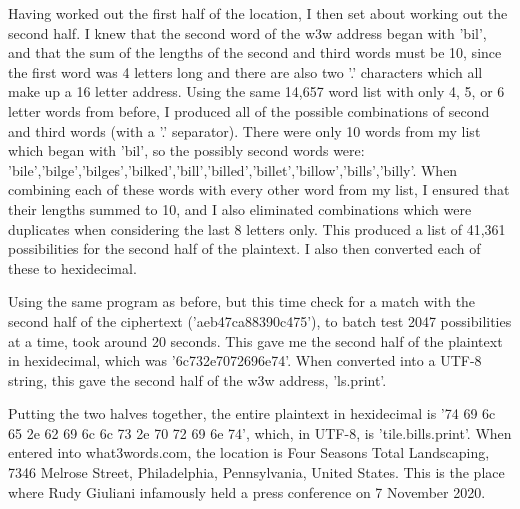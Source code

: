 \documentclass[a4paper, 11pt]{article}
\begin{document}
Having worked out the first half of the location, I then set about working out the second half. 
I knew that the second word of the w3w address began with 'bil', 
and that the sum of the lengths of the second and third words must be 10, 
since the first word was 4 letters long and there are also two '.' characters which all make up a 16 letter address. 
Using the same 14,657 word list with only 4, 5, or 6 letter words from before, I produced all of the possible combinations of second and third words (with a '.' separator). 
There were only 10 words from my list which began with 'bil', so the possibly second words were: 
'bile','bilge','bilges','bilked','bill','billed','billet','billow','bills','billy'. 
When combining each of these words with every other word from my list, I ensured that their lengths summed to 10, 
and I also eliminated combinations which were duplicates when considering the last 8 letters only. 
This produced a list of 41,361 possibilities for the second half of the plaintext. 
I also then converted each of these to hexidecimal. 

Using the same program as before, but this time check for a match with the second half of the ciphertext ('aeb47ca88390c475'), 
to batch test 2047 possibilities at a time, took around 20 seconds. 
This gave me the second half of the plaintext in hexidecimal, which was '6c732e7072696e74'. 
When converted into a UTF-8 string, this gave the second half of the w3w address, 'ls.print'. 

Putting the two halves together, the entire plaintext in hexidecimal is '74 69 6c 65 2e 62 69 6c 6c 73 2e 70 72 69 6e 74', 
which, in UTF-8, is 'tile.bills.print'. 
When entered into what3words.com, the location is Four Seasons Total Landscaping, 7346 Melrose Street, Philadelphia, Pennsylvania, United States. 
This is the place where Rudy Giuliani infamously held a press conference on 7 November 2020.
\end{document}
